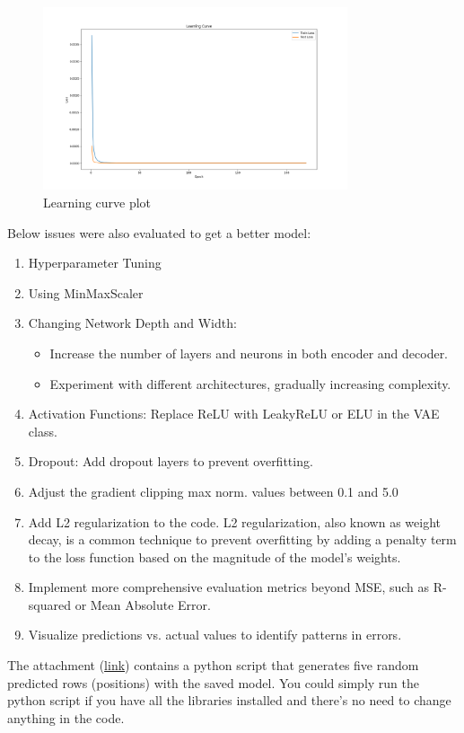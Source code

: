 \documentclass{article}
\begin{document}
\begin{figure}[h]
    \centering
    \includegraphics[width=0.8\textwidth]{VAE4thlearning_curve.png}
    \caption{Learning curve plot}
    \label{fig:learningcurve}
\end{figure}

Below issues were also evaluated to get a better model:

\begin{enumerate}
    \item Hyperparameter Tuning
    \item Using MinMaxScaler
    \item Changing Network Depth and Width:
    \begin{itemize}
        \item Increase the number of layers and neurons in both encoder and decoder.
        \item Experiment with different architectures, gradually increasing complexity.
    \end{itemize}
    \item Activation Functions: Replace ReLU with LeakyReLU or ELU in the VAE class.
    \item Dropout: Add dropout layers to prevent overfitting.
    \item Adjust the gradient clipping max norm. values between 0.1 and 5.0
    \item Add L2 regularization to the code. L2 regularization, also known as weight decay, is a common technique to prevent overfitting by adding a penalty term to the loss function based on the magnitude of the model's weights.
    \item Implement more comprehensive evaluation metrics beyond MSE, such as R-squared or Mean Absolute Error.
    \item Visualize predictions vs. actual values to identify patterns in errors.
\end{enumerate}

The attachment (\href{https://ksuemailprod-my.sharepoint.com/:f:/g/personal/ghanaatian_ksu_edu/Ek_s1HBx0yRNpPJa34HqJGoBzaNhzVutGev2CZHL_IE_yA?e=fcbfwg}{link}) contains a python script that generates five random predicted rows (positions) with the saved model. You could simply run the python script if you have all the libraries installed and there's no need to change anything in the code.



 
\end{document}
